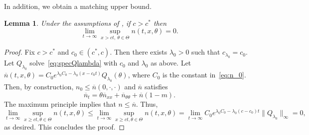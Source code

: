 \documentclass[11pt]{article}    %
\newtheorem{lem}[theorem]{Lemma}
\renewcommand{\epsilon}{\varepsilon}
\newcommand{\supp}{\mathrm{supp}\,}
\begin{document}
In addition, we obtain a matching upper bound.

\begin{lem}\label{lem:finite_speed_upper_bd}
	Under the assumptions of , if $c>c^*$ then
	\[
		\lim_{t\to\infty} \sup_{x > ct,~\theta\in\Theta} n(t,x,\theta) = 0.
	\]
\end{lem}
\begin{proof}%
	Fix $c > c^*$ and $c_0 \in (c^*,c)$.  Then there exists $\lambda_0>0$ such that $c_{\lambda_0} = c_0$.  Let $Q_{\lambda_0}$ solve~\eqref{eq:specQlambda} with $c_0$ and $\lambda_0$ as above.  Let $\overline n(t,x,\theta) = C_0 e^{\lambda_0 C_0 - \lambda_0(x-c_0 t)	} Q_{\lambda_0}(\theta)$, where $C_0$ is the constant in~\eqref{eq:n_0}.  Then, by construction, $n_0 \leq \overline n(0,\cdot,\cdot)$ and $\overline n$ satisfies
	\[
		\overline n_t = \theta \overline n_{xx} + \overline n_{\theta\theta} + \overline n(1-m).
	\]
	The maximum principle implies that $n \leq \overline n$. Thus,
	\[
		\lim_{t\to\infty}\sup_{x\geq ct, \theta\in\Theta} n(t,x,\theta)
			\leq \lim_{t\to\infty}\sup_{x\geq ct, \theta\in\Theta} n(t,x,\theta)
			= \lim_{t\to\infty} C_0 e^{\lambda_0 C_0 - \lambda_0(c-c_0)t} \|Q_{\lambda_0}\|_\infty
			= 0,
	\]
	as desired.  This concludes the proof.

\end{proof}
\end{document}
